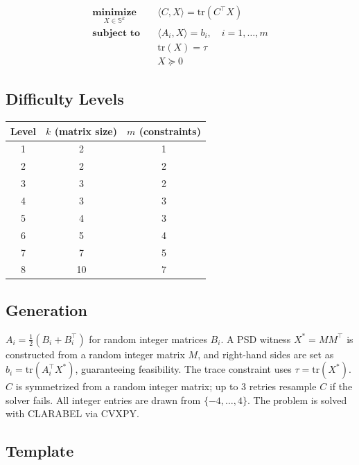 \documentclass[12pt]{article}
\begin{document}
\begin{align*}
    \underset{X \in \mathbb{S}^k}{\textbf{minimize}}   \quad & \langle C, X \rangle = \mathrm{tr}(C^\top X) \\
    \textbf{subject to} \quad                                  & \langle A_i, X \rangle = b_i, \quad i = 1, \ldots, m \\
                                                               & \mathrm{tr}(X) = \tau \\
                                                               & X \succeq 0
\end{align*}

\subsection{Difficulty Levels}

\begin{center}
\begin{tabular}{c|cc}
\hline
\textbf{Level} & $k$ (matrix size) & $m$ (constraints) \\
\hline
1 & 2  & 1 \\
2 & 2  & 2 \\
3 & 3  & 2 \\
4 & 3  & 3 \\
5 & 4  & 3 \\
6 & 5  & 4 \\
7 & 7  & 5 \\
8 & 10 & 7 \\
\hline
\end{tabular}
\end{center}

\subsection{Generation}

$A_i = \frac{1}{2}(B_i + B_i^\top)$ for random integer matrices $B_i$.
A PSD witness $X^* = MM^\top$ is constructed from a random integer matrix $M$,
and right-hand sides are set as $b_i = \mathrm{tr}(A_i^\top X^*)$, guaranteeing feasibility.
The trace constraint uses $\tau = \mathrm{tr}(X^*)$.
$C$ is symmetrized from a random integer matrix; up to 3 retries resample $C$ if the solver fails.
All integer entries are drawn from $\{-4, \ldots, 4\}$.
The problem is solved with CLARABEL via CVXPY.

\subsection{Template}
\end{document}
